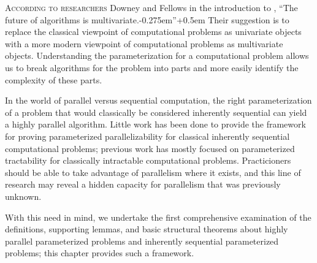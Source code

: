 %
%
%
\lettrine[loversize=0.125, lhang=0.05, findent=0.2em, nindent=0em]{A}{ccording to researchers} Downey and Fellows in the introduction to \autocite{df13}, ``The future of algorithms is multivariate.\kern-0.275em''\kern+0.5em
Their suggestion is to replace the classical viewpoint of computational problems as univariate objects with a more modern viewpoint of computational problems as multivariate objects.
Understanding the parameterization for a computational problem allows us to break algorithms for the problem into parts and more easily identify the complexity of these parts.

%
%
%
In the world of parallel versus sequential computation, the right parameterization of a problem that would classically be considered inherently sequential can yield a highly parallel algorithm.
Little work has been done to provide the framework for proving parameterized parallelizability for classical inherently sequential computational problems; previous work has mostly focused on parameterized tractability for classically intractable computational problems.
Practicioners should be able to take advantage of parallelism where it exists, and this line of research may reveal a hidden capacity for parallelism that was previously unknown.

%
%
%
With this need in mind, we undertake the first comprehensive examination of the definitions, supporting lemmas, and basic structural theorems about highly parallel parameterized problems and inherently sequential parameterized problems;
%
%
%
this chapter provides such a framework.

